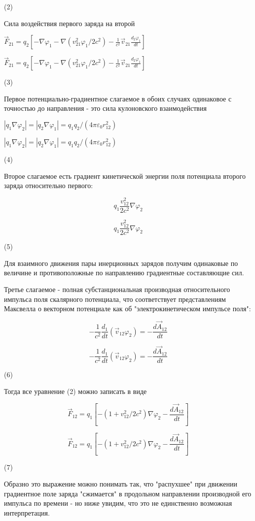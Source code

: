 \documentclass{article}
\begin{document}
(2)

Сила воздействия первого заряда на второй

$\vec F_{21}=q_2\left [-\nabla\varphi_1-\nabla(v_{21}^2\varphi_1/2c^2)-\frac{1}{c^2}\vec v_{21} \frac{d_2\varphi_1}{dt}\right ]$

$\vec F_{21}=q_2\left [-\nabla\varphi_1-\nabla(v_{21}^2\varphi_1/2c^2)-\frac{1}{c^2}\vec v_{21} \frac{d_2\varphi_1}{dt}\right ]$

(3)

Первое потенциально-градиентное слагаемое в обоих случаях одинаковое с точностью до направления - это сила кулоновского взаимодействия


$|q_1\nabla\varphi_2|=|q_2\nabla\varphi_1|=q_1q_2/(4\pi\varepsilon_0 r_{12}^2)$

$|q_1\nabla\varphi_2|=|q_2\nabla\varphi_1|=q_1q_2/(4\pi\varepsilon_0 r_{12}^2)$

(4)

Второе слагаемое есть градиент кинетической энергии поля потенциала второго заряда относительно первого:

$$q_1\frac{v_{12}^2}{2c^2}\nabla\varphi_2$$

$$q_1\frac{v_{12}^2}{2c^2}\nabla\varphi_2$$

(5)

Для взаимного движения пары инерционных зарядов получим одинаковые по величине и противоположные по направлению градиентные составляющие сил.


Третье слагаемое - полная субстанциональная производная относительного импульса поля скалярного потенциала, что соответствует представлениям Максвелла о векторном потенциале как об "электрокинетическом импульсе поля":

$$-\frac{1}{c^2}\frac{d_1}{dt}(\vec v_{12}\varphi_2)=-\frac{d\vec A_{12}}{dt}$$

$$-\frac{1}{c^2}\frac{d_1}{dt}(\vec v_{12}\varphi_2)=-\frac{d\vec A_{12}}{dt}$$

(6)

Тогда все уравнение (2) можно записать в виде

$$\vec F_{12}=q_1 [-(1+ v_{12}^2/2c^2)\nabla\varphi_2-\frac{d\vec A_{12}}{dt}]$$

$$\vec F_{12}=q_1 [-(1+ v_{12}^2/2c^2)\nabla\varphi_2-\frac{d\vec A_{12}}{dt}]$$

(7)

Образно это выражение можно понимать так, что "распухшее" при движении градиентное поле заряда "сжимается" в продольном направлении производной его импульса по времени - но ниже увидим, что это не единственно возможная интерпретация.
\end{document}
